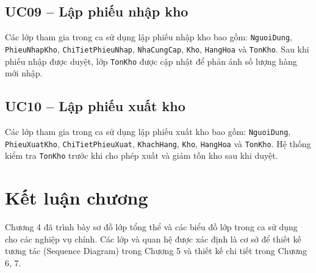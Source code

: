 

\subsection{UC09 -- Lập phiếu nhập kho}

Các lớp tham gia trong ca sử dụng lập phiếu nhập kho bao gồm: \texttt{NguoiDung}, \texttt{PhieuNhapKho}, \texttt{ChiTietPhieuNhap}, \texttt{NhaCungCap}, \texttt{Kho}, \texttt{HangHoa} và \texttt{TonKho}. Sau khi phiếu nhập được duyệt, lớp \texttt{TonKho} được cập nhật để phản ánh số lượng hàng mới nhập.



\subsection{UC10 -- Lập phiếu xuất kho}

Các lớp tham gia trong ca sử dụng lập phiếu xuất kho bao gồm: \texttt{NguoiDung}, \texttt{PhieuXuatKho}, \texttt{ChiTietPhieuXuat}, \texttt{KhachHang}, \texttt{Kho}, \texttt{HangHoa} và \texttt{TonKho}. Hệ thống kiểm tra \texttt{TonKho} trước khi cho phép xuất và giảm tồn kho sau khi duyệt.



\section{Kết luận chương}

Chương 4 đã trình bày sơ đồ lớp tổng thể và các biểu đồ lớp trong ca sử dụng cho các nghiệp vụ chính. Các lớp và quan hệ được xác định là cơ sở để thiết kế tương tác (Sequence Diagram) trong Chương 5 và thiết kế chi tiết trong Chương 6, 7.
